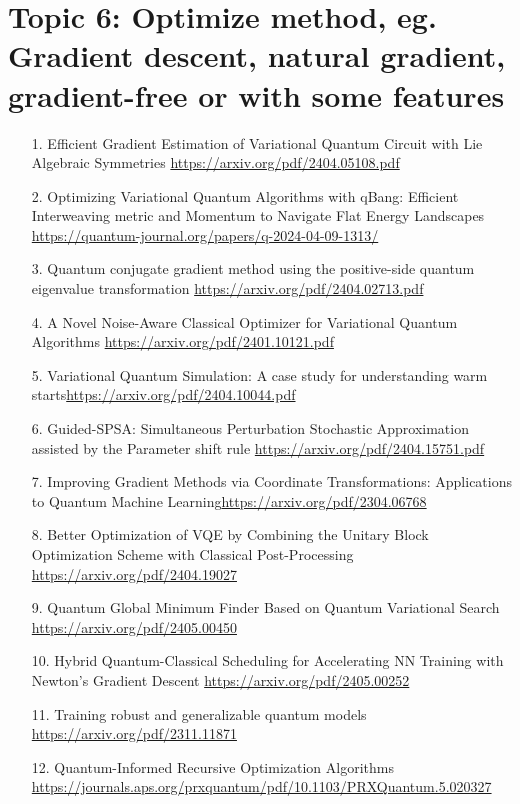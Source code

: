 \documentclass[12pt, oneside]{article}   	%
\begin{document}
\section{Topic 6: Optimize method, eg. Gradient descent, natural gradient, gradient-free or with some features}
\begin{itemize}
\item[1. ] Efficient Gradient Estimation of Variational Quantum Circuit with Lie Algebraic Symmetries \url{https://arxiv.org/pdf/2404.05108.pdf}
\item[2. ] Optimizing Variational Quantum Algorithms with qBang: Efficient Interweaving metric and Momentum to Navigate Flat Energy Landscapes \url{https://quantum-journal.org/papers/q-2024-04-09-1313/}
\item[3. ] Quantum conjugate gradient method using the positive-side quantum eigenvalue transformation \url{https://arxiv.org/pdf/2404.02713.pdf}
\item [4. ] A Novel Noise-Aware Classical Optimizer for Variational Quantum Algorithms \url{https://arxiv.org/pdf/2401.10121.pdf}
\item[5. ] Variational Quantum Simulation: A case study for understanding warm starts\url{https://arxiv.org/pdf/2404.10044.pdf}
\item[6. ] Guided-SPSA: Simultaneous Perturbation Stochastic Approximation assisted by the Parameter shift rule \url{https://arxiv.org/pdf/2404.15751.pdf}
\item[7. ] Improving Gradient Methods via Coordinate Transformations: Applications to Quantum Machine Learning\url{https://arxiv.org/pdf/2304.06768}
\item[8. ] Better Optimization of VQE by Combining the Unitary Block Optimization Scheme with Classical Post-Processing \url{https://arxiv.org/pdf/2404.19027} 
\item[9. ] Quantum Global Minimum Finder Based on Quantum Variational Search \url{https://arxiv.org/pdf/2405.00450} 
\item[10. ] Hybrid Quantum-Classical Scheduling for Accelerating NN Training with Newton's Gradient Descent \url{https://arxiv.org/pdf/2405.00252}
\item[11. ] Training robust and generalizable quantum models \url{https://arxiv.org/pdf/2311.11871}
\item[12. ] Quantum-Informed Recursive Optimization Algorithms \url{https://journals.aps.org/prxquantum/pdf/10.1103/PRXQuantum.5.020327}
\end{itemize}
\end{document}
